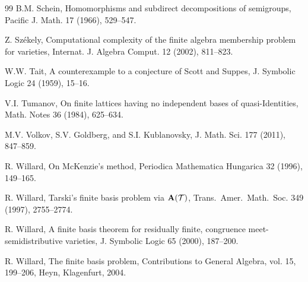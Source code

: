 \begin{thebibliography}{99}
 B.M. Schein, Homomorphisms and subdirect decompositions of semigroups, Pacific J. Math. 17 (1966), 529--547.

 Z. Sz\'ekely, Computational complexity of the finite algebra membership problem for varieties, Internat. J. Algebra Comput. 12 (2002), 811--823.

 W.W. Tait, A counterexample to a conjecture of Scott and Suppes, J. Symbolic Logic 24 (1959), 15--16.

 V.I. Tumanov, On finite lattices having no independent
bases of quasi-Identities, Math. Notes 36 (1984), 625--634.

 M.V. Volkov, S.V. Goldberg, and S.I. Kublanovsky, J. Math. Sci. 177 (2011), 847--859.

 R. Willard, On McKenzie's method, Periodica Mathematica Hungarica 32 (1996), 149--165.

R. Willard, Tarski's finite basis problem
via ${\bf A}(\mathcal{T})$, {Trans.\ Amer.\ Math.\ Soc.} {349} (1997), 2755--2774.

 R. Willard, A finite basis theorem for residually finite, congruence meet-semidistributive varieties, J. Symbolic Logic 65 (2000), 187--200.


 R. Willard, The finite basis problem, Contributions to General Algebra, vol. 15, 199--206, Heyn, Klagenfurt, 2004.



\end{thebibliography}
